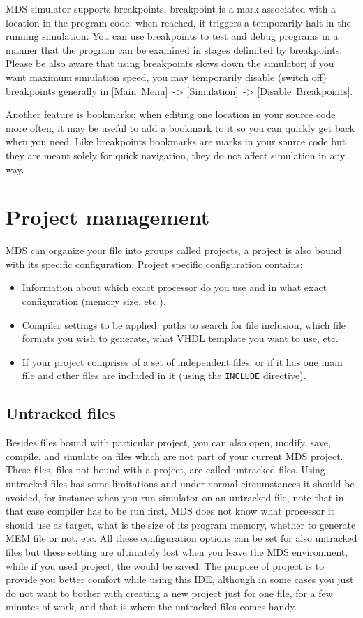         MDS simulator supports breakpoints, breakpoint is a mark associated with a location in the program code; when reached, it triggers a temporarily halt in the running simulation. You can use breakpoints to test and debug programs in a manner that the program can be examined in stages delimited by breakpoints. Please be also aware that using breakpoints slows down the simulator; if you want maximum simulation speed, you may temporarily disable (switch off) breakpoints generally in [Main~Menu]~-> [Simulation]~-> [Disable~Breakpoints].

        Another feature is bookmarks; when editing one location in your source code more often, it may be useful to add a bookmark to it so you can quickly get back when you need. Like breakpoints bookmarks are marks in your source code but they are meant solely for quick navigation, they do not affect simulation in any way.

\section{Project management}
    MDS can organize your file into groups called projects, a project is also bound with its specific configuration. Project specific configuration contains:
    \begin{itemize}
        \item Information about which exact processor do you use and in what exact configuration (memory size, etc.).
        \item Compiler settings to be applied: paths to search for file inclusion, which file formats you wish to generate, what VHDL template you want to use, etc.
        \item If your project comprises of a set of independent files, or if it has one main file and other files are included in it (using the \texttt{INCLUDE} directive).
    \end{itemize}

    \subsection{Untracked files}
        Besides files bound with particular project, you can also open, modify, save, compile, and simulate on files which are not part of your current MDS project. These files, files not bound with a project, are called untracked files. Using untracked files has some limitations and under normal circumstances it should be avoided, for instance when you run simulator on an untracked file, note that in that case compiler has to be run first, MDS does not know what processor it should use as target, what is the size of its program memory, whether to generate MEM file or not, etc. All these configuration options can be set for also untracked files but these setting are ultimately lost when you leave the MDS environment, while if you used project, the would be saved. The purpose of project is to provide you better comfort while using this IDE, although in some cases you just do not want to bother with creating a new project just for one file, for a few minutes of work, and that is where the untracked files comes handy.


